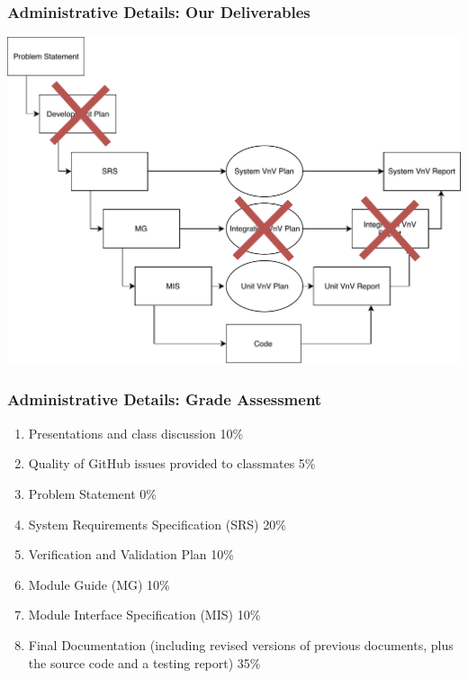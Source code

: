 \documentclass[t,12pt,numbers,fleqn]{beamer}
\begin{document}
\begin{frame}

\frametitle{Administrative Details: Our Deliverables}

\begin{center}
\includegraphics[scale=0.55]{../Figures/VModelOfProcessXOut.pdf}
\end{center}
\vspace{-1.0cm}

\end{frame}


\begin{frame}
\frametitle{Administrative Details: Grade Assessment}

\begin {enumerate}

\item Presentations and class discussion 10\%

\item Quality of GitHub issues provided to classmates 5\%

\item Problem Statement 0\%

\item System Requirements Specification (SRS) 20\%

\item Verification and Validation Plan 10\%

\item Module Guide (MG) 10\%

\item Module Interface Specification (MIS) 10\%

\item Final Documentation (including revised versions of previous documents,
  plus the source code and a testing report) 35\%

\end {enumerate}

\end{frame}
\end{document}
